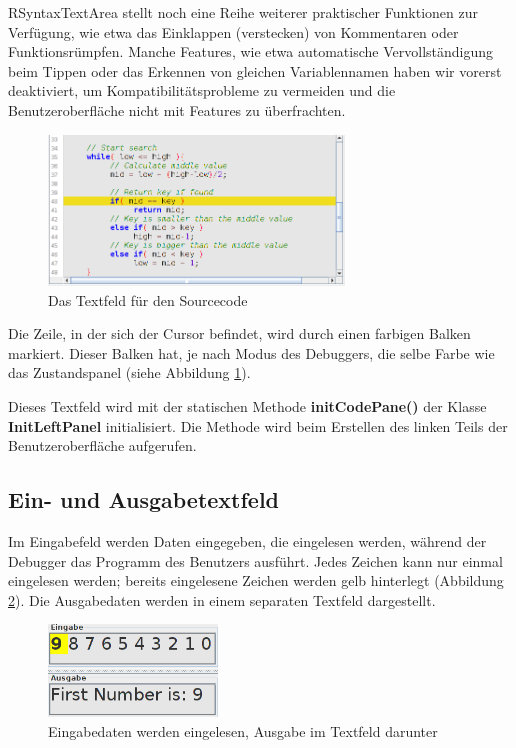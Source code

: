 RSyntaxTextArea stellt noch eine Reihe weiterer praktischer Funktionen zur Verfügung, wie etwa das Einklappen (verstecken) von Kommentaren oder Funktionsrümpfen. Manche Features, wie etwa automatische Vervollständigung beim Tippen oder das Erkennen von gleichen Variablennamen haben wir vorerst deaktiviert, um Kompatibilitätsprobleme zu vermeiden und die Benutzeroberfläche nicht mit Features zu überfrachten.

\begin{figure}[h!] 
  \centering
     \includegraphics[width=0.7\textwidth]{./media/images/gui/main/CCompact-gui-left-code-2.png}
  \caption{Das Textfeld für den Sourcecode}
  \label{fig:gui-main-left-code}
\end{figure}

Die Zeile, in der sich der Cursor befindet, wird durch einen farbigen Balken markiert. Dieser Balken hat, je nach Modus des Debuggers, die selbe Farbe wie das Zustandspanel (siehe Abbildung \ref{fig:gui-main-left-code}).

Dieses Textfeld wird mit der statischen Methode \textbf{initCodePane()} der Klasse \textbf{InitLeftPanel} initialisiert. Die Methode wird beim Erstellen des linken Teils der Benutzeroberfläche aufgerufen.

\subsection{Ein- und Ausgabetextfeld}
\label{sec:gui-main-left-io}

Im Eingabefeld werden Daten eingegeben, die eingelesen werden, während der Debugger das Programm des Benutzers ausführt. Jedes Zeichen kann nur einmal eingelesen werden; bereits eingelesene Zeichen werden gelb hinterlegt (Abbildung \ref{fig:gui-main-left-io}). Die Ausgabedaten werden in einem separaten Textfeld dargestellt.

\begin{figure}[h!] 
  \centering
     \includegraphics[width=0.4\textwidth]{./media/images/gui/main/io.png}
  \caption{Eingabedaten werden eingelesen, Ausgabe im Textfeld darunter}
  \label{fig:gui-main-left-io}
\end{figure}

